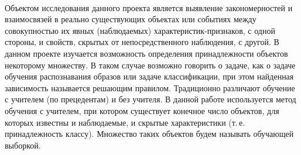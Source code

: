 \documentclass[12pt]{article}
\begin{document}
	 \\
	Объектом исследования данного проекта является выявление закономерностей и взаимосвязей в реально существующих объектах или событиях между совокупностью их явных (наблюдаемых) характеристик-признаков, с одной стороны, и свойств, скрытых от непосредственного наблюдения, с другой. 
	В данном проекте изучается возможность определения принадлежности объектов некоторому множеству. 
	В таком случае возможно говорить о задаче, как о задаче обучения распознавания образов или задаче классификации, при этом найденная зависимость называется решающим правилом. 
	Традиционно различают обучение с учителем (по прецедентам) и без учителя. 
	В данной работе используется метод обучения с учителем, при котором существует конечное число объектов, для которых известны и наблюдаемые, и скрытые характеристики (т.\,е. принадлежность классу). 
	Множество таких объектов будем называть обучающей выборкой.
\end{document}
